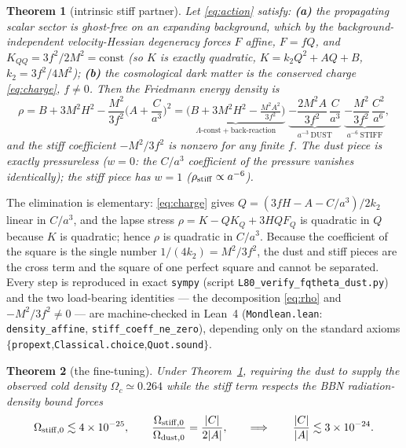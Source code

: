 \documentclass[11pt,letterpaper]{article}
\newtheorem{theorem}{Theorem}
\begin{document}
\begin{theorem}[intrinsic stiff partner]\label{thm:main}
Let \eqref{eq:action} satisfy: \textbf{(a)} the propagating scalar sector is ghost-free on an expanding
background, which by the background-independent velocity-Hessian degeneracy forces $F$ affine, $F=fQ$, and
$K_{QQ}=3f^2/2M^2=\text{const}$ (so $K$ is exactly quadratic, $K=k_2Q^2+AQ+B$, $k_2=3f^2/4M^2$);
\textbf{(b)} the cosmological dark matter is the conserved charge \eqref{eq:charge}, $f\neq0$. Then the
Friedmann energy density is
\begin{equation}
\rho=B+3M^2H^2-\frac{M^2}{3f^2}\Big(A+\frac{C}{a^3}\Big)^2
= \underbrace{\Big(B+3M^2H^2-\tfrac{M^2A^2}{3f^2}\Big)}_{\Lambda\text{-const}+\text{back-reaction}}
\;\underbrace{-\frac{2M^2A}{3f^2}\,\frac{C}{a^3}}_{a^{-3}\ \text{DUST}}
\;\underbrace{-\frac{M^2}{3f^2}\,\frac{C^2}{a^6}}_{a^{-6}\ \text{STIFF}} ,
\label{eq:rho}
\end{equation}
and the stiff coefficient $-M^2/3f^2$ is nonzero for any finite $f$. The dust piece is exactly pressureless
($w=0$: the $C/a^3$ coefficient of the pressure vanishes identically); the stiff piece has $w=1$
($\rho_{\rm stiff}\propto a^{-6}$).
\end{theorem}

The elimination is elementary: \eqref{eq:charge} gives $Q=(3fH-A-C/a^3)/2k_2$ linear in $C/a^3$, and the
lapse stress $\rho=K-QK_Q+3HQF_Q$ is quadratic in $Q$ because $K$ is quadratic; hence $\rho$ is quadratic in
$C/a^3$. Because the coefficient of the square is the single number $1/(4k_2)=M^2/3f^2$, the dust and stiff
pieces are the cross term and the square of one perfect square and cannot be separated. Every step is
reproduced in exact \texttt{sympy} (script \texttt{L80\_verify\_fqtheta\_dust.py}) and the two load-bearing
identities --- the decomposition \eqref{eq:rho} and $-M^2/3f^2\neq0$ --- are machine-checked in Lean~4
(\texttt{Mondlean.lean}: \texttt{density\_affine}, \texttt{stiff\_coeff\_ne\_zero}), depending only on the
standard axioms $\{$\texttt{propext},\texttt{Classical.choice},\texttt{Quot.sound}$\}$.

\begin{theorem}[the fine-tuning]\label{thm:tune}
Under Theorem~\ref{thm:main}, requiring the dust to supply the observed cold density $\Omega_c\simeq0.264$
while the stiff term respects the BBN radiation-density bound forces
\begin{equation}
\Omega_{\rm stiff,0}\lesssim 4\times10^{-25},\qquad
\frac{\Omega_{\rm stiff,0}}{\Omega_{\rm dust,0}}=\frac{|C|}{2|A|},\qquad\Longrightarrow\qquad
\frac{|C|}{|A|}\lesssim 3\times10^{-24}.
\end{equation}
\end{theorem}
\end{document}
